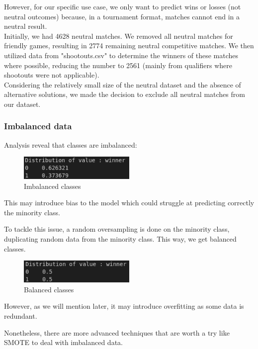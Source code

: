 \documentclass[a4paper,12pt]{article}
\begin{document}
However, for our specific use case, we only want to predict wins or losses (not neutral outcomes) because, in a tournament format, matches cannot end in a neutral result.\\

Initially, we had 4628 neutral matches. We removed all neutral matches for friendly games, resulting in 2774 remaining neutral competitive matches. We then utilized data from "shootouts.csv" to determine the winners of these matches where possible, reducing the number to 2561 (mainly from qualifiers where shootouts were not applicable).\\

Considering the relatively small size of the neutral dataset and the absence of alternative solutions, we made the decision to exclude all neutral matches from our dataset.

\subsubsection{Imbalanced data}
Analysis reveal that classes are imbalanced: 
\begin{figure}[H]
  \centering
  \includegraphics[width=0.5\textwidth]{./images/imbalanced.png}
  \caption{Imbalanced classes}
  \label{fig:imbalanced}
\end{figure}

This may introduce bias to the model which could struggle at predicting correctly the minority class.

To tackle this issue, a random oversampling is done on the minority class, duplicating random data from the minority class. This way, we get balanced classes. 

\begin{figure}[H]
  \centering
  \includegraphics[width=0.5\textwidth]{./images/balanced.png}
  \caption{Balanced classes}
  \label{fig:balanced}
\end{figure}

However, as we will mention later, it may introduce overfitting as some data is redundant.

Nonetheless, there are more advanced techniques that are worth a try like SMOTE to deal with imbalanced data.
\end{document}
